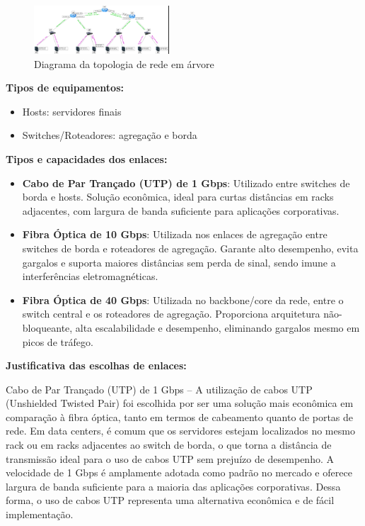 \documentclass[conference,compsoc]{IEEEtran}
\begin{document}
\begin{otherlanguage}{brazil}
\begin{figure}[!h]
\centering
\includegraphics[width=0.45\textwidth]{../media/diagrama.png}
\caption{Diagrama da topologia de rede em árvore}
\label{fig:topologia_projeto2}
\end{figure}

\textbf{Tipos de equipamentos:}
\begin{itemize}
    \item Hosts: servidores finais
    \item Switches/Roteadores: agregação e borda
\end{itemize}

\textbf{Tipos e capacidades dos enlaces:}
\begin{itemize}
    \item \textbf{Cabo de Par Trançado (UTP) de 1 Gbps}: Utilizado entre switches de borda e hosts. Solução econômica, ideal para curtas distâncias em racks adjacentes, com largura de banda suficiente para aplicações corporativas.
    \item \textbf{Fibra Óptica de 10 Gbps}: Utilizada nos enlaces de agregação entre switches de borda e roteadores de agregação. Garante alto desempenho, evita gargalos e suporta maiores distâncias sem perda de sinal, sendo imune a interferências eletromagnéticas.
    \item \textbf{Fibra Óptica de 40 Gbps}: Utilizada no backbone/core da rede, entre o switch central e os roteadores de agregação. Proporciona arquitetura não-bloqueante, alta escalabilidade e desempenho, eliminando gargalos mesmo em picos de tráfego.
\end{itemize}

\textbf{Justificativa das escolhas de enlaces:}

Cabo de Par Trançado (UTP) de 1 Gbps – A utilização de cabos UTP (Unshielded Twisted Pair) foi escolhida por ser uma solução mais econômica em comparação à fibra óptica, tanto em termos de cabeamento quanto de portas de rede. Em data centers, é comum que os servidores estejam localizados no mesmo rack ou em racks adjacentes ao switch de borda, o que torna a distância de transmissão ideal para o uso de cabos UTP sem prejuízo de desempenho. A velocidade de 1 Gbps é amplamente adotada como padrão no mercado e oferece largura de banda suficiente para a maioria das aplicações corporativas. Dessa forma, o uso de cabos UTP representa uma alternativa econômica e de fácil implementação.


\end{otherlanguage}
\end{document}
